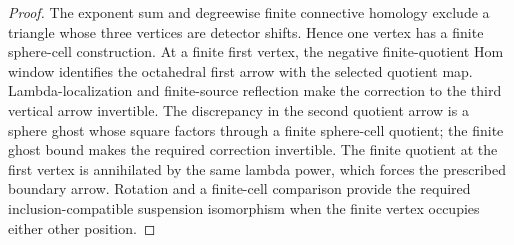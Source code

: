 \begin{proof}
The exponent sum and degreewise finite connective homology exclude a triangle whose three vertices are detector shifts. Hence one vertex has a finite sphere-cell construction. At a finite first vertex, the negative finite-quotient Hom window identifies the octahedral first arrow with the selected quotient map. Lambda-localization and finite-source reflection make the correction to the third vertical arrow invertible. The discrepancy in the second quotient arrow is a sphere ghost whose square factors through a finite sphere-cell quotient; the finite ghost bound makes the required correction invertible. The finite quotient at the first vertex is annihilated by the same lambda power, which forces the prescribed boundary arrow. Rotation and a finite-cell comparison provide the required inclusion-compatible suspension isomorphism when the finite vertex occupies either other position.
\end{proof}


